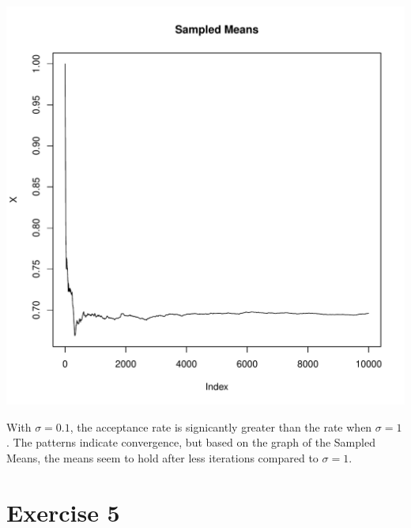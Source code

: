 \documentclass{article}\usepackage[]{graphicx}\usepackage[]{color}
\makeatletter
\newenvironment{kframe}{%
 \def\at@end@of@kframe{}%
 \ifinner\ifhmode%
  \def\at@end@of@kframe{\end{minipage}}%
  \begin{minipage}{\columnwidth}%
 \fi\fi%
 \def\FrameCommand##1{\hskip\@totalleftmargin \hskip-\fboxsep
 \colorbox{shadecolor}{##1}\hskip-\fboxsep
     \hskip-\linewidth \hskip-\@totalleftmargin \hskip\columnwidth}%
 \MakeFramed {\advance\hsize-\width
   \@totalleftmargin\z@ \linewidth\hsize
   \@setminipage}}%
 {\par\unskip\endMakeFramed%
 \at@end@of@kframe}
\newenvironment{knitrout}{}{} %
\makeatother
\begin{document}
\begin{knitrout}
\begin{kframe}
\end{kframe}
\includegraphics[width=0.60\linewidth]{figure/unnamed-chunk-4-2} 

\end{knitrout}
With $\sigma = 0.1$, the acceptance rate is signicantly greater than the rate when $\sigma = 1$. The patterns indicate convergence, but based on the graph of the Sampled Means, the means seem to hold after less iterations compared to $\sigma = 1$.

\section*{Exercise 5}
\end{document}
